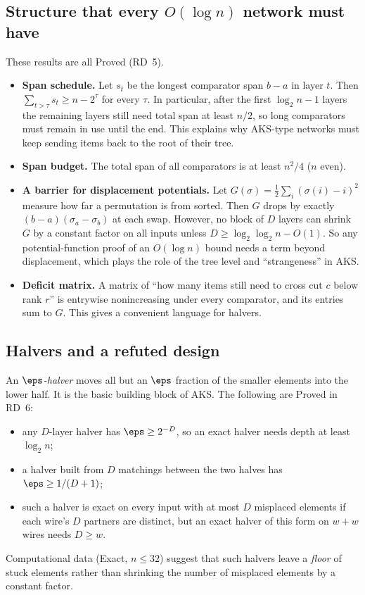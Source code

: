 \subsection{Structure that every \texorpdfstring{$O(\log n)$}{O(log n)} network must have}\label{sec:structure}

These results are all Proved (RD~5).
\begin{itemize}
    \item \textbf{Span schedule.} Let $s_t$ be the longest comparator span $b - a$ in layer $t$. Then $\sum_{t > \tau} s_t \ge n - 2^\tau$ for every $\tau$. In particular, after the first $\log_2 n - 1$ layers the remaining layers still need total span at least $n/2$, so long comparators must remain in use until the end. This explains why AKS-type networks must keep sending items back to the root of their tree.
    \item \textbf{Span budget.} The total span of all comparators is at least $n^2/4$ ($n$ even).
    \item \textbf{A barrier for displacement potentials.} Let $G(\sigma) = \frac12 \sum_i (\sigma(i) - i)^2$ measure how far a permutation is from sorted. Then $G$ drops by exactly $(b-a)(\sigma_a - \sigma_b)$ at each swap. However, no block of $D$ layers can shrink $G$ by a constant factor on all inputs unless $D \ge \log_2\log_2 n - O(1)$. So any potential-function proof of an $O(\log n)$ bound needs a term beyond displacement, which plays the role of the tree level and ``strangeness'' in AKS.
    \item \textbf{Deficit matrix.} A matrix of ``how many items still need to cross cut $c$ below rank $r$'' is entrywise nonincreasing under every comparator, and its entries sum to $G$. This gives a convenient language for halvers.
\end{itemize}

\subsection{Halvers and a refuted design}\label{sec:halvers}

An \emph{$\eps$-halver} moves all but an $\eps$ fraction of the smaller elements into the lower half. It is the basic building block of AKS. The following are Proved in RD~6:
\begin{itemize}
    \item any $D$-layer halver has $\eps \ge 2^{-D}$, so an exact halver needs depth at least $\log_2 n$;
    \item a halver built from $D$ matchings between the two halves has $\eps \ge 1/(D+1)$;
    \item such a halver is exact on every input with at most $D$ misplaced elements if each wire's $D$ partners are distinct, but an exact halver of this form on $w + w$ wires needs $D \ge w$.
\end{itemize}
Computational data (Exact, $n \le 32$) suggest that such halvers leave a \emph{floor} of stuck elements rather than shrinking the number of misplaced elements by a constant factor.

